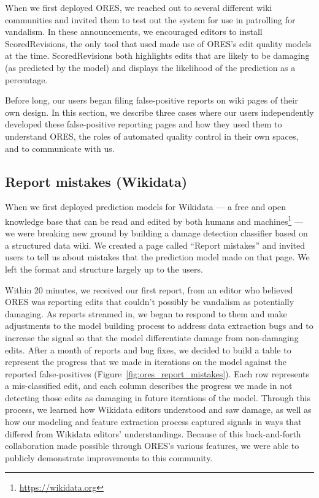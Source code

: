 When we first deployed ORES, we reached out to several different wiki communities and invited them to test out the system for use in patrolling for vandalism.  In these announcements, we encouraged editors to install ScoredRevisions, the only tool that used made use of ORES's edit quality models at the time.  ScoredRevisions both highlights edits that are likely to be damaging (as predicted by the model) and displays the likelihood of the prediction as a percentage.

Before long, our users began filing false-positive reports on wiki pages of their own design.  In this section, we describe three cases where our users independently developed these false-positive reporting pages and how they used them to understand ORES, the roles of automated quality control in their own spaces, and to communicate with us.

\subsection{Report mistakes (Wikidata)}

When we first deployed prediction models for Wikidata --- a free and open knowledge base that can be read and edited by both humans and machines\footnote{\url{https://wikidata.org}} --- we were breaking new ground by building a damage detection classifier based on a structured data wiki\cite{sarabadani2017building}.  We created a page called ``Report mistakes'' and invited users to tell us about mistakes that the prediction model made on that page. We left the format and structure largely up to the users.

Within 20 minutes, we received our first report, from an editor who believed ORES was reporting edits that couldn't possibly be vandalism as potentially damaging.  As reports streamed in, we began to respond to them and make adjustments to the model building process to address data extraction bugs and to increase the signal so that the model differentiate damage from non-damaging edits.  After a month of reports and bug fixes, we decided to build a table to represent the progress that we made in iterations on the model against the reported false-positives (Figure~\ref{fig:ores_report_mistakes}).  Each row represents a mis-classified edit, and each column describes the progress we made in not detecting those edits as damaging in future iterations of the model.  Through this process, we learned how Wikidata editors understood and saw damage, as well as how our modeling and feature extraction process captured signals in ways that differed from Wikidata editors' understandings.  Because of this back-and-forth collaboration made possible through ORES's various features, we were able to publicly demonstrate improvements to this community.

